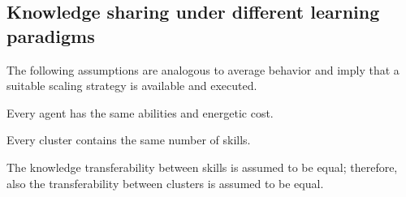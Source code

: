 \subsection{Knowledge sharing under different learning paradigms}
The following assumptions are analogous to average behavior and imply that a suitable scaling strategy is available and executed.
\begin{tcolorbox}
	\begin{assumption}\label{assumption:agent_similarity}
		Every agent has the same abilities and energetic cost.
	\end{assumption}
\end{tcolorbox}
\begin{tcolorbox}
	\begin{assumption}\label{assumption:cluster_size}
		Every cluster contains the same number of skills.
	\end{assumption}
\end{tcolorbox}
\begin{tcolorbox}
	\begin{assumption}\label{assumption:cluster_transferability}
		The knowledge transferability between skills is assumed to be equal; therefore, also the transferability between clusters is assumed to be equal.
	\end{assumption}
\end{tcolorbox}
